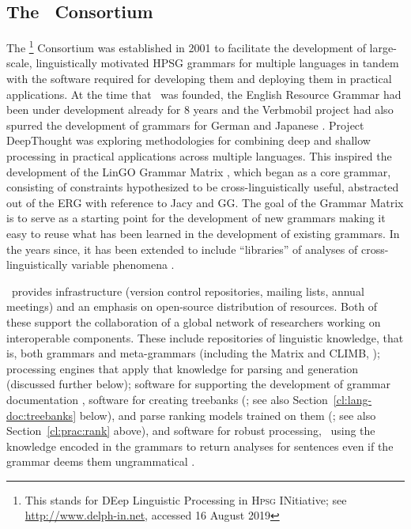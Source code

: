 \documentclass[output=paper,nonflat]{langsci/langscibook}
\begin{document}
\subsection{The \delphin\ Consortium}
\label{cl:delphin}

The \delphin\footnote{This stands for DEep Linguistic
  Processing in \textsc{Hpsg} INitiative; see \url{http://www.delph-in.net}, accessed 16 August 2019} Consortium
was established in 2001 to facilitate the development of large-scale,
linguistically motivated HPSG grammars for multiple languages in tandem
with the software required for developing them and deploying them in
practical applications. At the time that \delphin\ was founded, the
English Resource Grammar
\citep[ERG;][]{Flickinger2000a,Flickinger2011a-u} had been under
development already for 8 years and the Verbmobil project
\citep{Wahlster2000a-ed} had also spurred the development of grammars for
German \citep[GG;][]{MK2000a-cr,Crysmann2003b} and Japanese
\citep*[Jacy;][]{SBB2016a}. Project DeepThought
\citep*{Callmeier-etal:2004} was exploring methodologies for combining
deep and shallow processing in practical applications across multiple
languages. This inspired the development of the LinGO Grammar Matrix
\citep*{BFO2002a-u}, which began as a core grammar, consisting of
constraints hypothesized to be cross-linguistically useful, abstracted
out of the ERG with reference to Jacy and GG. The goal of the Grammar
Matrix is to serve as a starting point for the development of new
grammars making it easy to reuse what has been learned in the
development of existing grammars. In the years since, it has been
extended to include ``libraries'' of analyses of cross-linguistically
variable phenomena \citep[e.g.,][]{Drellishak2009a-u,BDFPS2010a-u}.

\delphin\ provides infrastructure (version control repositories,
mailing lists, annual meetings) and an emphasis on open-source
distribution of resources. Both of these support the collaboration of a
global network of researchers working on interoperable
components. These include repositories of linguistic knowledge, that
is, both grammars and meta-grammars (including the Matrix and CLIMB,
\citealt{Fokkens:14}); processing engines that apply that
knowledge for parsing and generation (discussed further below);
software for supporting the development of grammar documentation
\citep[e.g.,][]{Hashimoto-etal:07}, software for creating treebanks
(\citealt{OFTM2004a-u,Packard:15}; see also Section~\ref{cl:lang-doc:treebanks} below), 
and parse ranking models trained on them
(\citealt{Tou:Man:Fli:Oep:05}; see also Section~\ref{cl:prac:rank} above), and
software for robust processing, \ie\ using the knowledge encoded in
the grammars to return analyses for sentences even if the grammar
deems them ungrammatical
\citep{W11-2923,buys2017parse,chen2018parse}.
\end{document}
